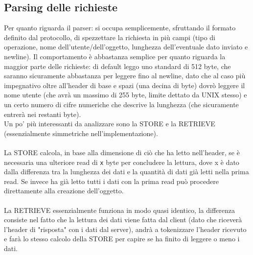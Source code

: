 \subsection{Parsing delle richieste}
\begin{flushleft}
Per quanto riguarda il parser: si occupa semplicemente, sfruttando il formato definito dal protocollo, di spezzettare la richiesta in più campi (tipo di operazione, nome dell'utente/dell'oggetto, lunghezza dell'eventuale dato inviato e newline). Il comportamento è abbastanza semplice per quanto riguarda la maggior parte delle richieste: di default leggo uno standard di 512 byte, che saranno sicuramente abbastanza per leggere fino al newline, dato che al caso più impegnativo oltre all'header di base e spazi (una decina di byte) dovrò leggere il nome utente (che avrà un massimo di 255 byte, limite dettato da UNIX stesso) e un certo numero di cifre numeriche che descrive la lunghezza (che sicuramente entrerà nei restanti byte).\\Un po' più interessanti da analizzare sono la STORE e la RETRIEVE (essenzialmente simmetriche nell'implementazione).\\~\\

La STORE calcola, in base alla dimensione di ciò che ha letto nell'header, se è necessaria una ulteriore read di \texttt{x} byte per concludere la lettura, dove x è dato dalla differenza tra la lunghezza dei dati e la quantità di dati già letti nella prima read. Se invece ha già letto tutti i dati con la prima read può procedere direttamente alla creazione dell'oggetto.
\\~\\
La RETRIEVE essenzialmente funziona in modo quasi identico, la differenza consiste nel fatto che la lettura dei dati viene fatta dal client (dato che riceverà l'header di "risposta" con i dati dal server), andrà a tokenizzare l'header ricevuto e farà lo stesso calcolo della STORE per capire se ha finito di leggere o meno i dati. 

\end{flushleft}

